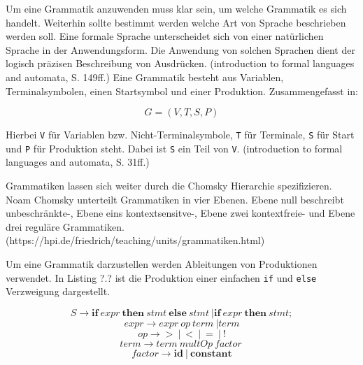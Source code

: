 Um eine Grammatik anzuwenden muss klar sein, um welche Grammatik es sich handelt. Weiterhin sollte bestimmt werden welche Art von Sprache beschrieben werden soll. 
Eine formale Sprache unterscheidet sich von einer natürlichen Sprache in der Anwendungsform. Die Anwendung von solchen Sprachen dient der logisch präzisen Beschreibung von Ausdrücken. (introduction to formal languages and automata, S. 149ff.) Eine Grammatik besteht aus Variablen, Terminalsymbolen, einen Startsymbol und einer Produktion. Zusammengefasst in:

\begin{center}
\begin{equation}
G=(V,T,S,P)
\end{equation}
\end{center}

Hierbei \verb+V+ für Variablen bzw. Nicht-Terminalsymbole, \verb+T+ für Terminale, \verb+S+ für Start und \verb+P+ für Produktion steht. Dabei ist \verb+S+ ein Teil von \verb+V+. (introduction to formal languages and automata, S. 31ff.)


Grammatiken lassen sich weiter durch die Chomsky Hierarchie spezifizieren. Noam Chomsky unterteilt Grammatiken in vier Ebenen. Ebene null beschreibt unbeschränkte-, Ebene eins kontextsensitve-, Ebene zwei kontextfreie- und Ebene drei reguläre Grammatiken.(https://hpi.de/friedrich/teaching/units/grammatiken.html) 

\pagebreak

Um eine Grammatik darzustellen werden Ableitungen von Produktionen verwendet. In Listing ?.? ist die Produktion einer einfachen \verb+if+ und \verb+else+ Verzweigung dargestellt.

\begin{center}
\begin{equation}
S \to \mathbf{if}\: expr\: \mathbf{then}\: stmt\: \mathbf{else}\: stmt\: | \mathbf{if}\: expr\: \mathbf{then}\: stmt;
\end{equation}
\begin{equation}
expr \to expr\: op\: term\: | term
\end{equation}
\begin{equation}
op \to \mathbf{>}\: |\: \mathbf{<}\: |\: \mathbf{=}\: |\: \mathbf{!}
\end{equation}
\begin{equation}
term \to term\: multOp\: factor\:
\end{equation}
\begin{equation}
factor \to \mathbf{id}\: |\: \mathbf{constant} 
\end{equation}
\end{center}
 
